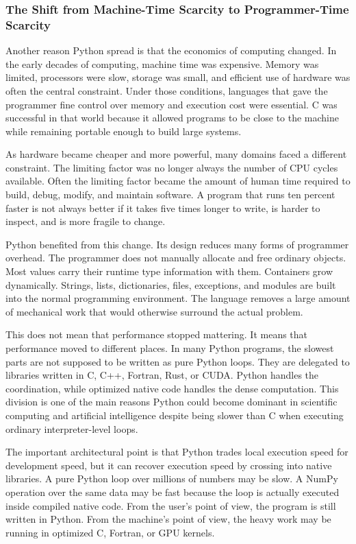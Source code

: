 \subsubsection{The Shift from Machine-Time Scarcity to Programmer-Time Scarcity}

Another reason Python spread is that the economics of computing changed. In the early decades of computing, machine time was expensive. Memory was limited, processors were slow, storage was small, and efficient use of hardware was often the central constraint. Under those conditions, languages that gave the programmer fine control over memory and execution cost were essential. C was successful in that world because it allowed programs to be close to the machine while remaining portable enough to build large systems.

As hardware became cheaper and more powerful, many domains faced a different constraint. The limiting factor was no longer always the number of CPU cycles available. Often the limiting factor became the amount of human time required to build, debug, modify, and maintain software. A program that runs ten percent faster is not always better if it takes five times longer to write, is harder to inspect, and is more fragile to change.

Python benefited from this change. Its design reduces many forms of programmer overhead. The programmer does not manually allocate and free ordinary objects. Most values carry their runtime type information with them. Containers grow dynamically. Strings, lists, dictionaries, files, exceptions, and modules are built into the normal programming environment. The language removes a large amount of mechanical work that would otherwise surround the actual problem.

This does not mean that performance stopped mattering. It means that performance moved to different places. In many Python programs, the slowest parts are not supposed to be written as pure Python loops. They are delegated to libraries written in C, C++, Fortran, Rust, or CUDA. Python handles the coordination, while optimized native code handles the dense computation. This division is one of the main reasons Python could become dominant in scientific computing and artificial intelligence despite being slower than C when executing ordinary interpreter-level loops.

The important architectural point is that Python trades local execution speed for development speed, but it can recover execution speed by crossing into native libraries. A pure Python loop over millions of numbers may be slow. A NumPy operation over the same data may be fast because the loop is actually executed inside compiled native code. From the user's point of view, the program is still written in Python. From the machine's point of view, the heavy work may be running in optimized C, Fortran, or GPU kernels.

